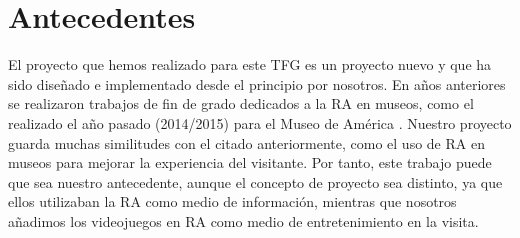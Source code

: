 \section{Antecedentes}
\label{cap1:sec:antecedentes}

El proyecto que hemos realizado para este TFG es un proyecto nuevo y que ha sido diseñado e implementado desde el principio por nosotros. En años anteriores se realizaron trabajos de fin de grado dedicados a la RA en museos, como el realizado el año pasado (2014/2015) para el Museo de América \citep{RACMA}. Nuestro proyecto guarda muchas similitudes con el citado anteriormente, como el uso de RA en museos para mejorar la experiencia del visitante. Por tanto, este trabajo puede que sea nuestro antecedente, aunque el concepto de proyecto sea distinto, ya que ellos utilizaban la RA como medio de información, mientras que nosotros añadimos los videojuegos en RA como medio de entretenimiento en la visita.

